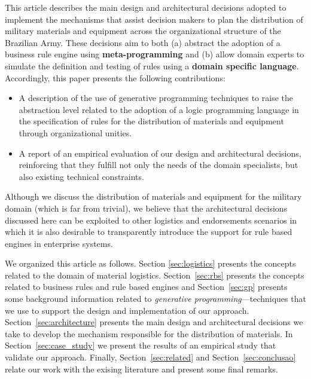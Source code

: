 \documentclass{bmcart}
\begin{document}
This article describes the main design and architectural decisions adopted to implement the mechanisms that assist decision makers to plan the distribution of military materials and equipment across the organizational structure of the Brazilian Army. These decisions aim to both (a) abstract the adoption of a business rule engine using {\bf meta-programming} and (b) allow domain experts to simulate the definition and testing of rules using a {\bf domain specific language}. Accordingly, this paper presents the following contributions:

\begin{itemize}
	\item A description of the use of generative programming techniques to raise the abstraction level 	related to the adoption of a logic programming language in the specification of rules for the 	distribution of materials and equipment through organizational unities.
	\item A report of an empirical evaluation of our design and architectural decisions, reinforcing that they fulfill not only the needs of the domain specialists, but also existing technical constraints. 	
\end{itemize} 

Although we discuss the distribution of materials and equipment for the military domain (which is far from trivial), we believe that the architectural decisions discussed here can be exploited to other logistics and endorsements scenarios in which it is also desirable to transparently introduce the support for rule based engines in enterprise systems.

We organized this article as follows. Section \ref{sec:logistics} presents the concepts related to the domain of material logistics. Section~\ref{sec:rbs} presents the concepts related to business rules and rule based engines and Section~\ref{sec:gp} presents some 
background information related to \emph{generative programming}---techniques that we use to support the design and implementation of our approach. Section~\ref{sec:architecture} presents the main design and architectural decisions we take to develop the mechanism responsible for the distribution of materials. In Section~\ref{sec:case_study} we present the results of an empirical study that validate our approach. Finally, Section~\ref{sec:related} and Section~\ref{sec:conclusao} relate our work with the exising literature and present some final remarks. 
\end{document}
